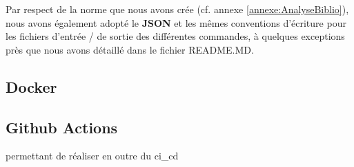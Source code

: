 Par respect de la norme que nous avons crée (cf. annexe \ref{annexe:AnalyseBiblio}), nous avons également adopté le \textbf{JSON} et les mêmes conventions d'écriture 
pour les fichiers d'entrée / de sortie des différentes commandes, à quelques exceptions près que nous avons détaillé dans le fichier README.MD. 

\pagebreak
\subsection{Docker}
\subsection{Github Actions}

permettant de réaliser en outre du \gls{ci_cd}

